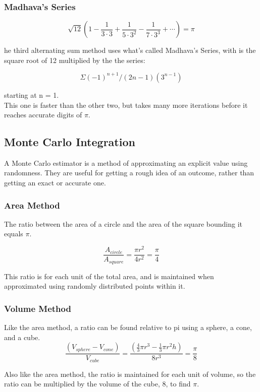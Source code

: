 \documentclass[11pt]{article}
\begin{document}
\subsubsection*{Madhava's Series}
\[\sqrt{12}\left(1 - \frac{1}{3\cdot 3} + \frac{1}{5\cdot 3^2} - \frac{1}{7\cdot 3^3} + \cdots\right) = \pi\]

he third alternating sum method uses what’s called Madhava’s Series, with is the square root of 12 multiplied by the the series:

\[\Sigma(-1)^{n+1} / (2n-1)(3^{n-1})\]

starting at n = 1.\\

This one is faster than the other two, but takes many more iterations before it reaches accurate digits of $\pi$.

\subsection{Monte Carlo Integration}\label{S:3.3}
A Monte Carlo estimator is a method of approximating an explicit value using randomness. They are useful for getting a rough idea of an outcome, rather than getting an exact or accurate one. 

\subsubsection*{Area Method}
The ratio between the area of a circle and the area of the square bounding it equals $\pi$.

\[\frac{A_{circle}}{A_{square}}=\frac{\pi r^2}{4 r^2} = \frac{\pi}{4}\]

This ratio is for each unit of the total area, and is maintained when approximated using randomly distributed points within it.

\subsubsection*{Volume Method}
Like the area method, a ratio can be found relative to pi using a sphere, a cone, and a cube.
\[\frac{(V_{sphere}-V_{cone})}{V_{cube}}=\frac{\left(\frac{4}{3}\pi r^3 - \frac{1}{3}\pi r^2 h\right)}{8r^3}=\frac{\pi}{8}\]

Also like the area method, the ratio is maintained for each unit of volume, so the ratio can be multiplied by the volume of the cube, 8, to find $\pi$.
\end{document}
